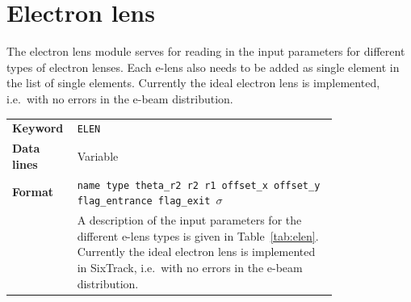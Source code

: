 \section{Electron lens} \label{sec:elen}

The electron lens module serves for reading in the input parameters for different types of electron lenses.
Each e-lens also needs to be added as single element in the list of single elements.
Currently the ideal electron lens is implemented, i.e.~with no errors in the e-beam distribution.

\bigskip
\begin{tabular}{@{}lp{0.8\linewidth}}
    \textbf{Keyword}    & \texttt{ELEN} \\
    \textbf{Data lines} & Variable \\
    \textbf{Format}     & \texttt{name type theta\_r2 r2 r1 offset\_x offset\_y flag\_entrance flag\_exit $\sigma$} \\
                        & A description of the input parameters for the different e-lens types is given in Table~\ref{tab:elen}. Currently the ideal electron lens is implemented in SixTrack, i.e.~with no errors in the e-beam distribution.
\end{tabular}

